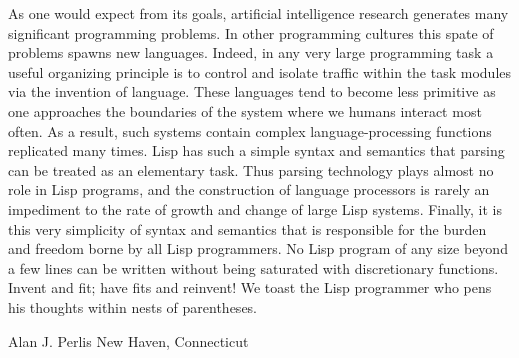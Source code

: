 As one would expect from its goals,
artificial intelligence research generates many significant programming problems.
In other programming cultures this spate of problems spawns new languages.
Indeed, in any very large programming task a useful organizing principle is to control
and isolate traffic within the task modules via the invention of language.
These languages tend to become less primitive as one approaches the boundaries of the system
where we humans interact most often.
As a result, such systems contain complex language-processing functions replicated many times.
Lisp has such a simple syntax and semantics that parsing can be treated as an elementary task.
Thus parsing technology plays almost no role in Lisp programs,
and the construction of language processors is rarely an impediment to the rate of growth
and change of large Lisp systems.
Finally, it is this very simplicity of syntax and semantics that is responsible for
the burden and freedom borne by all Lisp programmers.
No Lisp program of any size beyond a few lines can be written without being saturated with discretionary functions.
Invent and fit; have fits and reinvent!
We toast the Lisp programmer who pens his thoughts within nests of parentheses.

Alan J. Perlis
New Haven, Connecticut
